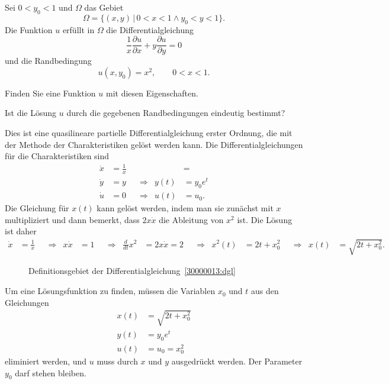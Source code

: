 Sei $0 < y_0 < 1$ und $\Omega$ das Gebiet
\[
\Omega=\{ (x,y)\,|\, 0<x<1\wedge y_0 < y < 1\}.
\]
Die Funktion $u$ erfüllt in $\Omega$ die Differentialgleichung
\begin{equation}
\frac1x \frac{\partial u}{\partial x}
+
y\frac{\partial u}{\partial y}
=
0
\label{30000012:dgl}
\end{equation}
und die Randbedingung 
\[
u(x,y_0)=x^2,\qquad 0<x<1.
\]
\begin{teilaufgaben}
\item
Finden Sie eine Funktion $u$ mit diesen Eigenschaften.
\item
Ist die Lösung $u$ durch die gegebenen Randbedingungen eindeutig bestimmt?
\end{teilaufgaben}

\begin{loesung}
Dies ist eine quasilineare partielle Differentialgleichung erster Ordnung,
die mit der Methode der Charakteristiken gelöst werden kann.
Die Differentialgleichungen für die Charakteristiken sind
\[
\begin{aligned}
\dot x &= \frac1x &&           &        &=         \\
\dot y &=       y &&\Rightarrow&   y(t) &= y_0 e^t \\
\dot u &= 0       &&\Rightarrow&   u(t) &= u_0.
\end{aligned}
\]
Die Gleichung für $x(t)$ kann gelöst werden, indem man sie zunächst mit
$x$ multipliziert und dann bemerkt, dass $2x\dot x$ die Ableitung von $x^2$
ist.
Die Lösung ist daher
\begin{align*}
\dot x &= \frac1x
&&\Rightarrow&
x\dot x &= 1
&&\Rightarrow&
\frac{d}{dt}x^2&=2x\dot x=2
&&\Rightarrow&
x^2(t) &= 2t + x_0^2
&&\Rightarrow&
x(t)&=\sqrt{2t+x_0^2}.
\end{align*}
\begin{figure}
\centering
{}
\caption{Definitionsgebiet der Differentialgleichung~\ref{30000013:dgl}
\label{30000013:domain}}
\end{figure}
\begin{teilaufgaben}
\item
Um eine Lösungsfunktion zu finden, müssen die Variablen $x_0$ und $t$ aus den
Gleichungen
\begin{align*}
x(t)&=\sqrt{2t+x_0^2}\\
y(t) &= y_0e^t\\
u(t)&=u_0 = x_0^2
\end{align*}
eliminiert werden, und $u$ muss durch $x$ und $y$ ausgedrückt werden.
Der Parameter $y_0$ darf stehen bleiben.


\end{teilaufgaben}
\end{loesung}
